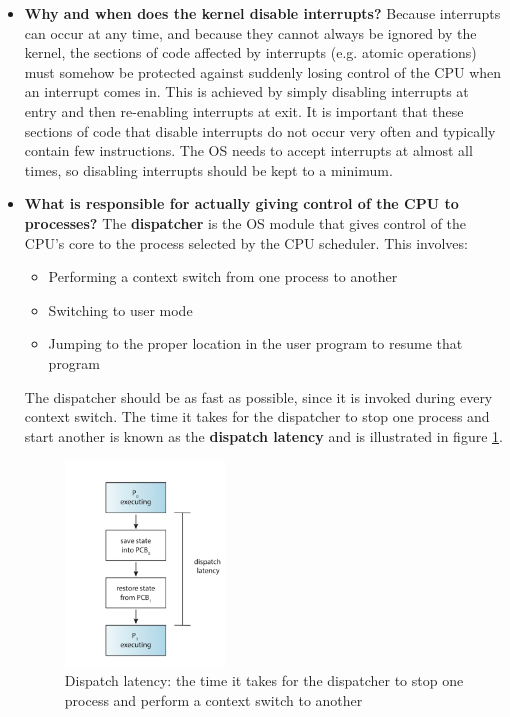 \documentclass[12pt]{article}
\begin{document}
\begin{itemize}
    \item \textbf{Why and when does the kernel disable interrupts?} Because interrupts can occur at any time, and because they cannot always be ignored by the kernel, the sections of code affected by interrupts (e.g. atomic operations) must somehow be protected against suddenly losing control of the CPU when an interrupt comes in. This is achieved by simply disabling interrupts at entry and then re-enabling interrupts at exit. It is important that these sections of code that disable interrupts do not occur very often and typically contain few instructions. The OS needs to accept interrupts at almost all times, so disabling interrupts should be kept to a minimum.
    \item \textbf{What is responsible for actually giving control of the CPU to processes?} The \textbf{dispatcher} is the OS module that gives control of the CPU's core to the process selected by the CPU scheduler. This involves:
        \begin{itemize}
            \item Performing a context switch from one process to another
            \item Switching to user mode
            \item Jumping to the proper location in the user program to resume that program
        \end{itemize}
        The dispatcher should be as fast as possible, since it is invoked during every context switch. The time it takes for the dispatcher to stop one process and start another is known as the \textbf{dispatch latency} and is illustrated in figure \ref{fig:dispatch-latency}.
        \begin{figure}[ht]
            \centering
            \includegraphics[width=0.4\textwidth]{figures/dispatch-latency.jpg}
            \caption{Dispatch latency: the time it takes for the dispatcher to stop one process and perform a context switch to another}
            \label{fig:dispatch-latency}
        \end{figure}
\end{itemize}
\end{document}

